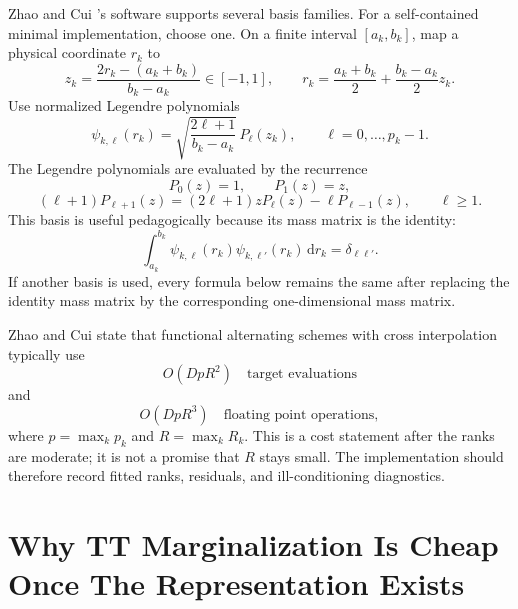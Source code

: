 \documentclass[11pt]{article}
\numberwithin{equation}{section}
\newcommand{\dd}{\,\mathrm d}
\begin{document}
Zhao and Cui \cite{zhao2024ttsequential}'s software supports several basis families.  For a self-contained
minimal implementation, choose one.  On a finite interval
\([a_k,b_k]\), map a physical coordinate \(r_k\) to
\begin{equation}
    z_k=\frac{2r_k-(a_k+b_k)}{b_k-a_k}\in[-1,1],
    \qquad
    r_k=\frac{a_k+b_k}{2}+\frac{b_k-a_k}{2}z_k.
    \label{eq:p24-tt-6}
\end{equation}
Use normalized Legendre polynomials
\begin{equation}
    \psi_{k,\ell}(r_k)
    =
    \sqrt{\frac{2\ell+1}{b_k-a_k}}\,
    P_\ell(z_k),
    \qquad \ell=0,\ldots,p_k-1.
    \label{eq:p24-tt-7}
\end{equation}
The Legendre polynomials are evaluated by the recurrence
\[
    P_0(z)=1,\qquad P_1(z)=z,
\]
\begin{equation}
    (\ell+1)P_{\ell+1}(z)
    =
    (2\ell+1)zP_\ell(z)-\ell P_{\ell-1}(z),
    \qquad \ell\ge1.
    \label{eq:p24-tt-8}
\end{equation}
This basis is useful pedagogically because its mass matrix is the identity:
\begin{equation}
    \int_{a_k}^{b_k}\psi_{k,\ell}(r_k)\psi_{k,\ell'}(r_k)\dd r_k
    =
    \delta_{\ell\ell'}.
    \label{eq:p24-tt-9}
\end{equation}
If another basis is used, every formula below remains the same after replacing
the identity mass matrix by the corresponding one-dimensional mass matrix.

Zhao and Cui \cite{zhao2024ttsequential} state that functional alternating schemes with cross interpolation
typically use
\begin{equation}
    O(DpR^2)\quad\text{target evaluations}
    \label{eq:p24-tt-10}
\end{equation}
and
\begin{equation}
    O(DpR^3)\quad\text{floating point operations},
    \label{eq:p24-tt-11}
\end{equation}
where \(p=\max_k p_k\) and \(R=\max_k R_k\).  This is a cost statement after
the ranks are moderate; it is not a promise that \(R\) stays small.  The
implementation should therefore record fitted ranks, residuals, and
ill-conditioning diagnostics.

\section{Why TT Marginalization Is Cheap Once The Representation Exists}
\end{document}
